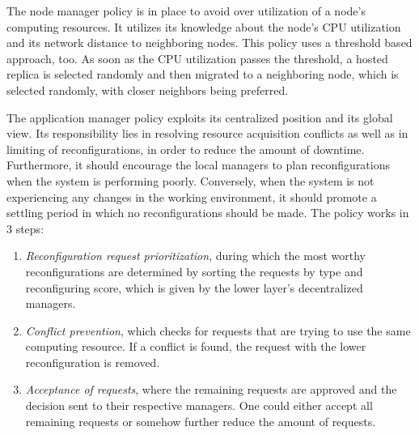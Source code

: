         \quad The node manager policy is in place to avoid over utilization of a node's computing resources. 
        It utilizes its knowledge about the node's CPU utilization and its network distance to neighboring nodes.
        This policy uses a threshold based approach, too. As soon as the CPU utilization passes the threshold, a hosted replica is selected 
        randomly and then migrated to a neighboring node, which is selected randomly, with closer neighbors being preferred. 

        \quad The application manager policy exploits its centralized position and its global view. 
        Its responsibility lies in resolving resource acquisition conflicts as well as in limiting of reconfigurations, 
        in order to reduce the amount of downtime. Furthermore, it should encourage the local managers to plan reconfigurations when the system 
        is performing poorly. Conversely, when the system is not experiencing any changes in the working environment, it should promote a settling period 
        in which no reconfigurations should be made.
        The policy works in 3 steps:

        \begin{enumerate}
            \item \textit{Reconfiguration request prioritization}, during which the most worthy reconfigurations are determined by sorting the requests 
            by type and reconfiguring score, which is given by the lower layer's decentralized managers. 
            \item \textit{Conflict prevention}, which checks for requests that are trying to use the same computing resource. If a conflict is found, the 
            request with the lower reconfiguration is removed.
            \item \textit{Acceptance of requests}, where the remaining requests are approved and the decision sent to their respective managers. 
            One could either accept all remaining requests or somehow further reduce the amount of requests.
        \end{enumerate}

